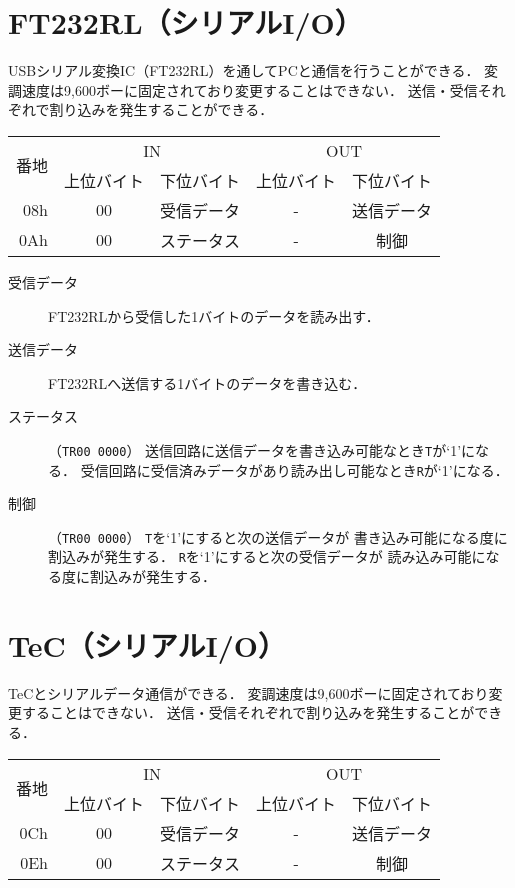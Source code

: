 \section{FT232RL（シリアルI/O）}
USBシリアル変換IC（FT232RL）を通してPCと通信を行うことができる．
変調速度は9,600ボーに固定されており変更することはできない．
送信・受信それぞれで割り込みを発生することができる．

\begin{center}
  \small\begin{tabular}{| r | c | c || c | c |}\hline
    \multirow{2}{*}{番地}
    & \multicolumn{2}{|c||}{IN}
    & \multicolumn{2}{c|}{OUT}
    \\\cline{2-5}
         & 上位バイト & 下位バイト & 上位バイト & 下位バイト
    \\\hline\hline
    08h  &  00 & 受信データ
         &  -  & 送信データ \\\hline
    0Ah  &  00 & ステータス
         &  -  & 制御 \\\hline
  \end{tabular}
\end{center}

\begin{description}
\item[受信データ]
  FT232RLから受信した1バイトのデータを読み出す．
\item[送信データ]
  FT232RLへ送信する1バイトのデータを書き込む．
\item[ステータス]（\texttt{TR00 0000}）
  送信回路に送信データを書き込み可能なとき\texttt{T}が`1'になる．
  受信回路に受信済みデータがあり読み出し可能なとき\texttt{R}が`1'になる．
\item[制御]（\texttt{TR00 0000}）
  \texttt{T}を`1'にすると次の送信データが
  書き込み可能になる度に割込みが発生する．
  \texttt{R}を`1'にすると次の受信データが
  読み込み可能になる度に割込みが発生する．
\end{description}

\section{TeC（シリアルI/O）}
TeCとシリアルデータ通信ができる．
変調速度は9,600ボーに固定されており変更することはできない．
送信・受信それぞれで割り込みを発生することができる．

\begin{center}
  \small\begin{tabular}{| r | c | c || c | c |}\hline
    \multirow{2}{*}{番地}
    & \multicolumn{2}{|c||}{IN}
    & \multicolumn{2}{c|}{OUT}
    \\\cline{2-5}
         & 上位バイト & 下位バイト & 上位バイト & 下位バイト
    \\\hline\hline
    0Ch  &  00 & 受信データ
         &  -  & 送信データ \\\hline
    0Eh  &  00 & ステータス
         &  -  & 制御 \\\hline
  \end{tabular}
\end{center}

